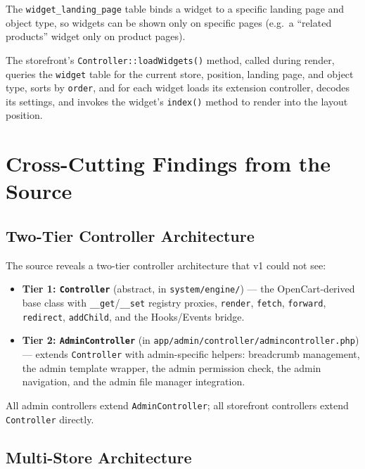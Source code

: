 \documentclass[11pt,a4paper]{article}
\begin{document}
The \texttt{widget\_landing\_page} table binds a widget to a
specific landing page and object type, so widgets can be shown only
on specific pages (e.g.\ a ``related products'' widget only on
product pages).

The storefront's \texttt{Controller::loadWidgets()} method, called
during render, queries the \texttt{widget} table for the current
store, position, landing page, and object type, sorts by
\texttt{order}, and for each widget loads its extension controller,
decodes its settings, and invokes the widget's \texttt{index()}
method to render into the layout position.

\section{Cross-Cutting Findings from the Source}\label{sec:crosscutting-source}

\subsection{Two-Tier Controller Architecture}

The source reveals a two-tier controller architecture that v1 could
not see:

\begin{itemize}[leftmargin=1.6em,itemsep=2pt]
  \item \textbf{Tier 1: \texttt{Controller}} (abstract, in
        \texttt{system/engine/}) --- the OpenCart-derived base
        class with \texttt{\_\_get}/\texttt{\_\_set} registry
        proxies, \texttt{render}, \texttt{fetch}, \texttt{forward},
        \texttt{redirect}, \texttt{addChild}, and the Hooks/Events
        bridge.
  \item \textbf{Tier 2: \texttt{AdminController}} (in
        \texttt{app/admin/controller/admincontroller.php}) ---
        extends \texttt{Controller} with admin-specific helpers:
        breadcrumb management, the admin template wrapper, the
        admin permission check, the admin navigation, and the
        admin file manager integration.
\end{itemize}

All admin controllers extend \texttt{AdminController}; all
storefront controllers extend \texttt{Controller} directly.

\subsection{Multi-Store Architecture}
\end{document}
